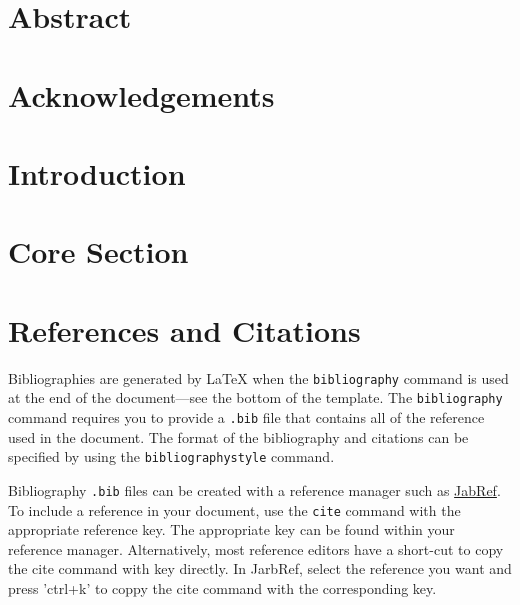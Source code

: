 \documentclass{UoNMCHA}
\begin{document}
	

	\vspace{-5mm}
	\section*{Abstract}
	\vspace{-3mm}
		

	\vspace{-2mm}
	\section*{Acknowledgements}
	\vspace{-3mm}
		

	\newpage\tableofcontents
	
	\newpage\section{Introduction}
		

	\newpage\section{Core Section}\label{sec:Core Section}
		


	\newpage\section{References and Citations}\label{sec:RefCite}
Bibliographies are generated by LaTeX when the \verb|bibliography| command is used at the end of the document---see the bottom of the template. The \verb|bibliography| command requires you to provide a \texttt{.bib} file that contains all of the reference used in the document. The format of the bibliography and citations can be specified by using the \verb|bibliographystyle| command.

Bibliography \texttt{.bib} files can be created with a reference manager such as \href{https://www.jabref.org/}{JabRef}. To include a reference in your document, use the \verb|cite| command with the appropriate reference key. The appropriate key can be found within your reference manager. Alternatively, most reference editors have a short-cut to copy the cite command with key directly. In JarbRef, select the reference you want and press 'ctrl+k' to coppy the cite command with the corresponding key.
\end{document}
